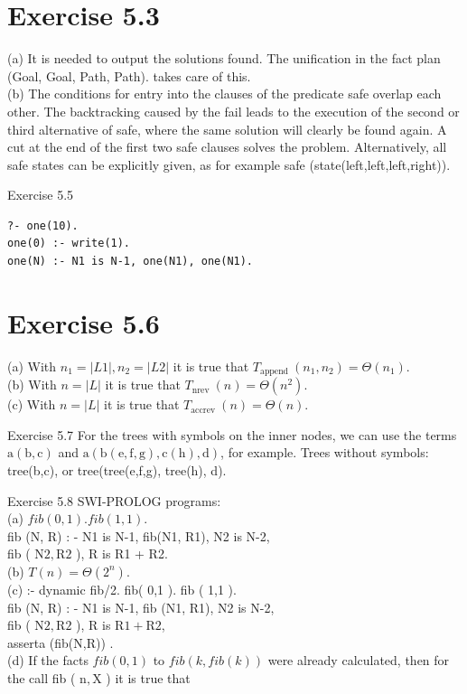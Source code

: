 \documentclass[10pt]{article}
\begin{document}
\section*{Exercise 5.3}
(a) It is needed to output the solutions found. The unification in the fact plan (Goal, Goal, Path, Path). takes care of this.\\
(b) The conditions for entry into the clauses of the predicate safe overlap each other. The backtracking caused by the fail leads to the execution of the second or third alternative of safe, where the same solution will clearly be found again. A cut at the end of the first two safe clauses solves the problem. Alternatively, all safe states can be explicitly given, as for example safe (state(left,left,left,right)).

Exercise 5.5

\begin{verbatim}
?- one(10).
one(0) :- write(1).
one(N) :- N1 is N-1, one(N1), one(N1).
\end{verbatim}

\section*{Exercise 5.6}
(a) With $n_{1}=|L 1|, n_{2}=|L 2|$ it is true that $T_{\text {append }}\left(n_{1}, n_{2}\right)=\Theta\left(n_{1}\right)$.\\
(b) With $n=|L|$ it is true that $T_{\text {nrev }}(n)=\Theta\left(n^{2}\right)$.\\
(c) With $n=|L|$ it is true that $T_{\text {accrev }}(n)=\Theta(n)$.

Exercise 5.7 For the trees with symbols on the inner nodes, we can use the terms $\mathrm{a}(\mathrm{b}, \mathrm{c})$ and $\mathrm{a}(\mathrm{b}(\mathrm{e}, \mathrm{f}, \mathrm{g}), \mathrm{c}(\mathrm{h}), \mathrm{d})$, for example. Trees without symbols: tree(b,c), or tree(tree(e,f,g), tree(h), d).

Exercise 5.8 SWI-PROLOG programs:\\
(a) $f i b(0,1) . f i b(1,1)$.\\
fib (N, R) : - N1 is N-1, fib(N1, R1), N2 is N-2,\\
fib ( $\mathrm{N} 2, \mathrm{R} 2$ ), R is R1 + R2.\\
(b) $T(n)=\Theta\left(2^{n}\right)$.\\
(c) :- dynamic fib/2. fib( 0,1 ). fib ( 1,1 ).\\
fib (N, R) : - N1 is N-1, fib (N1, R1), N2 is N-2,\\
fib ( $\mathrm{N} 2, \mathrm{R} 2$ ), R is $\mathrm{R} 1+\mathrm{R} 2$,\\
asserta (fib(N,R)) .\\
(d) If the facts $f i b(0,1)$ to $f i b(k, f i b(k))$ were already calculated, then for the call fib ( $\mathrm{n}, \mathrm{X}$ ) it is true that
\end{document}
